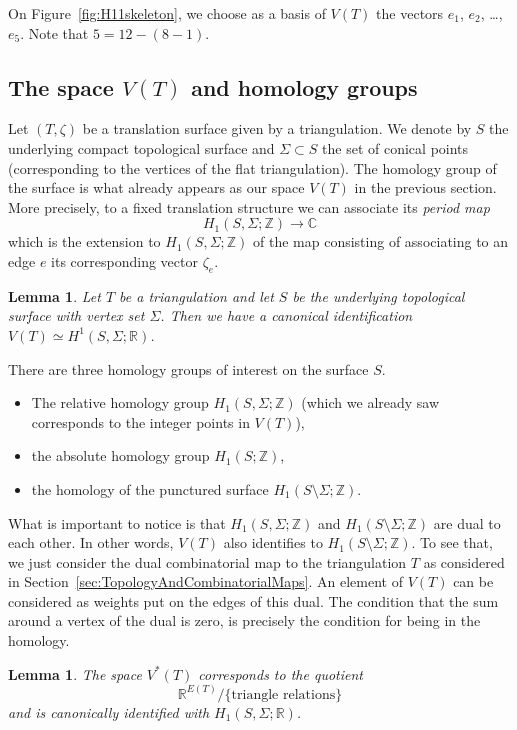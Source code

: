 \documentclass[a4paper,12pt]{article}
\def\bC{\mathbb{C}}
\def\bR{\mathbb{R}}
\def\bZ{\mathbb{Z}}
\newtheorem{lemma}[definition]{Lemma}
\begin{document}
On Figure~\ref{fig:H11skeleton}, we choose as a basis of $V(T)$ the vectors
$e_1$, $e_2$, \ldots, $e_5$. Note that $5 = 12 - (8 - 1)$.

\subsection{The space $V(T)$ and homology groups}
Let $(T, \zeta)$ be a translation surface given by a triangulation. We denote
by $S$ the underlying compact topological surface and $\Sigma \subset S$ the
set of conical points (corresponding to the vertices of the flat
triangulation). The homology group of the surface is what already appears as
our space $V(T)$ in the previous section. More precisely, to a fixed
translation structure we can associate its \emph{period map}
\[
H_1(S, \Sigma; \bZ) \to \bC
\]
which is the extension to $H_1(S, \Sigma; \bZ)$ of the map consisting of associating to
an edge $e$ its corresponding vector $\zeta_e$.
\begin{lemma}
Let $T$ be a triangulation and let $S$ be the underlying topological surface
with vertex set $\Sigma$. Then we have a canonical identification
$V(T) \simeq H^1(S, \Sigma; \bR)$.
\end{lemma}

There are three homology groups of interest on the surface $S$.
\begin{itemize}
\item The relative homology group $H_1(S, \Sigma; \bZ)$ (which we already saw corresponds to the integer points in $V(T)$),
\item the absolute homology group $H_1(S; \bZ)$,
\item the homology of the punctured surface $H_1(S \setminus \Sigma; \bZ)$.
\end{itemize}

What is important to notice is that $H_1(S, \Sigma; \bZ)$ and $H_1(S \setminus
\Sigma; \bZ)$ are dual to each other. In other words, $V(T)$ also identifies
to $H_1(S \setminus \Sigma; \bZ)$. To see that, we just consider the dual
combinatorial map to the triangulation $T$ as considered in
Section~\ref{sec:TopologyAndCombinatorialMaps}. An element of
$V(T)$ can be considered as weights put on the edges of this dual.
The condition that the sum around a vertex of the dual is zero,
is precisely the condition for being in the homology.

\begin{lemma}
\label{sec:VT:dual}
The space $V^*(T)$ corresponds to the quotient
\[
\bR^{E(T)} / \{\text{triangle relations}\}
\]
and is canonically identified with $H_1(S, \Sigma; \bR)$.
\end{lemma}
\end{document}
